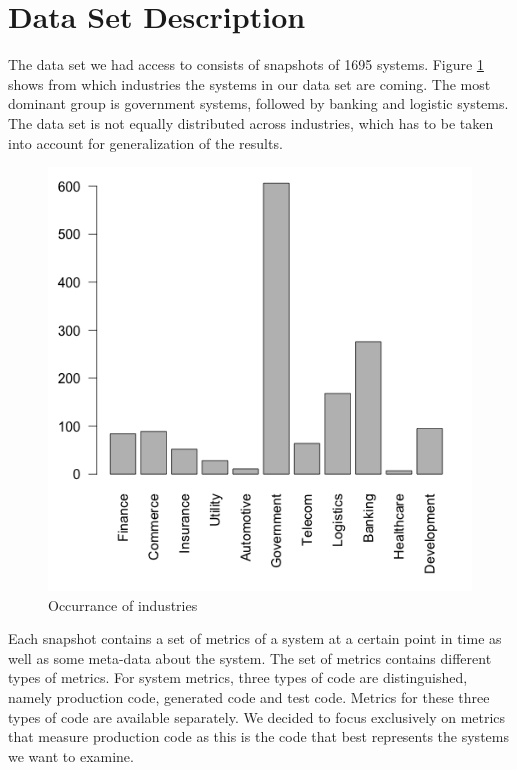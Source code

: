 \section{Data Set Description}
\label{sec:datasetdescription}
The data set we had access to consists of snapshots of 1695 systems. Figure \ref{fig:industries} shows from which industries the systems in our data set are coming. The most dominant group is government systems, followed by banking and logistic systems. The data set is not equally distributed across industries, which has to be taken into account for generalization of the results.

\begin{figure}
\centering
\includegraphics[width=\linewidth]{figs/ind_occ.png}
\caption{Occurrance of industries}
\label{fig:industries}
\end{figure}

Each snapshot contains a set of metrics of a system at a certain point in time as well as some meta-data about the system. The set of metrics contains different types of metrics. For system metrics, three types of code are distinguished, namely production code, generated code and test code. Metrics for these three types of code are available separately. We decided to focus exclusively on metrics that measure production code as this is the code that best represents the systems we want to examine.

